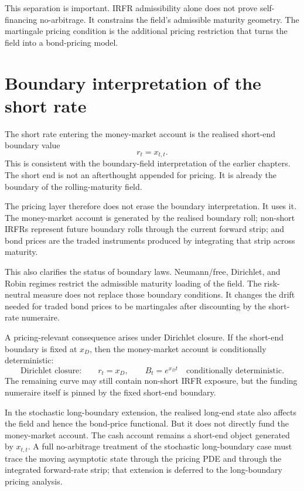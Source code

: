 \documentclass[11pt,oneside]{book}
\begin{document}
This separation is important. IRFR admissibility alone does not prove
self-financing no-arbitrage. It constrains the field's admissible
maturity geometry. The martingale pricing condition is the additional
pricing restriction that turns the field into a bond-pricing model.


\section{Boundary interpretation of the short rate}
\label{boundary-interpretation-of-the-short-rate}

The short rate entering the money-market account is the realised short-end
boundary value
\[
r_t=x_{t,t}.
\]
This is consistent with the boundary-field interpretation of the earlier
chapters. The short end is not an afterthought appended for pricing. It is
already the boundary of the rolling-maturity field.

The pricing layer therefore does not erase the boundary interpretation.
It uses it. The money-market account is generated by the realised boundary
roll; non-short IRFRs represent future boundary rolls through the current
forward strip; and bond prices are the traded instruments produced by
integrating that strip across maturity.

This also clarifies the status of boundary laws. Neumann/free,
Dirichlet, and Robin regimes restrict the admissible maturity loading of
the field. The risk-neutral measure does not replace those boundary
conditions. It changes the drift needed for traded bond prices to be
martingales after discounting by the short-rate numeraire.

A pricing-relevant consequence arises under Dirichlet closure. If the
short-end boundary is fixed at \(x_D\), then the money-market account is
conditionally deterministic:
\[
\boxed{
\text{Dirichlet closure:}\qquad
r_t=x_D,
\qquad
B_t=e^{x_Dt}
\quad\text{conditionally deterministic.}
}
\]
The remaining curve may still contain non-short IRFR exposure, but the
funding numeraire itself is pinned by the fixed short-end boundary.

In the stochastic long-boundary extension, the realised long-end state
also affects the field and hence the bond-price functional. But it does
not directly fund the money-market account. The cash account remains a
short-end object generated by \(x_{t,t}\). A full no-arbitrage treatment of
the stochastic long-boundary case must trace the moving asymptotic state
through the pricing PDE and through the integrated forward-rate strip; that
extension is deferred to the long-boundary pricing analysis.
\end{document}
